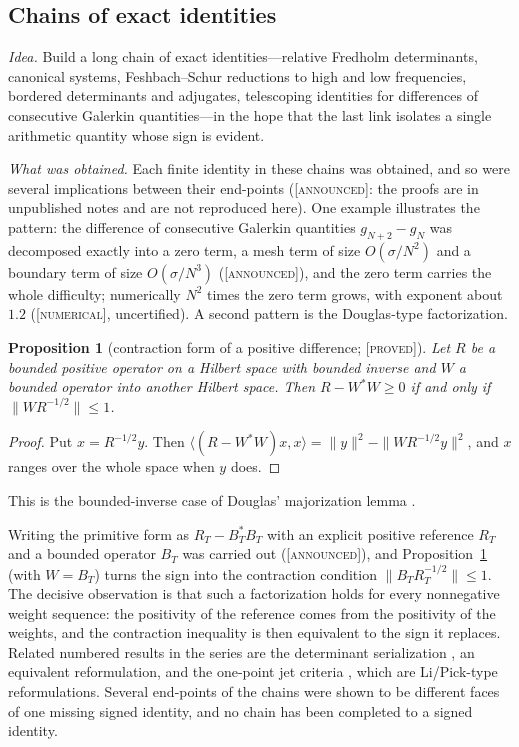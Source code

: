 \documentclass[11pt]{amsart}
\newtheorem{proposition}[theorem]{Proposition}
\theoremstyle{definition}
\theoremstyle{remark}
\numberwithin{equation}{section}
\newcommand{\stag}[1]{\textsc{[#1]}}
\newcommand{\PROVED}{\stag{proved}}
\newcommand{\NUM}{\stag{numerical}}
\newcommand{\ANNOUNCED}{\stag{announced}}
\newcommand{\entry}[1]{\par\smallskip\noindent\textit{#1.}\enspace}
\begin{document}
\subsection{Chains of exact identities}\label{w6:fam:R12}

\entry{Idea} Build a long chain of exact identities---relative Fredholm determinants, canonical
systems, Feshbach--Schur reductions to high and low frequencies, bordered determinants and
adjugates, telescoping identities for differences of consecutive Galerkin quantities---in the hope
that the last link isolates a single arithmetic quantity whose sign is evident.

\entry{What was obtained} Each finite identity in these chains was obtained, and so were several
implications between their end-points (\ANNOUNCED: the proofs are in unpublished notes and are not
reproduced here). One example illustrates the pattern: the difference of consecutive Galerkin
quantities $g_{N+2}-g_N$ was decomposed exactly into a zero term, a mesh term of size
$O(\sigma/N^2)$ and a boundary term of size $O(\sigma/N^3)$ (\ANNOUNCED), and the zero term carries
the whole difficulty; numerically $N^2$ times the zero term grows, with exponent about $1.2$ (\NUM,
uncertified). A second pattern is the Douglas-type factorization.

\begin{proposition}[contraction form of a positive difference; \PROVED]\label{w6:prop:douglas}
Let $R$ be a bounded positive operator on a Hilbert space with bounded inverse and $W$ a bounded
operator into another Hilbert space. Then $R-W^*W\ge0$ if and only if $\|WR^{-1/2}\|\le1$.
\end{proposition}
\begin{proof}
Put $x=R^{-1/2}y$. Then $\langle(R-W^*W)x,x\rangle=\|y\|^2-\|WR^{-1/2}y\|^2$, and $x$ ranges over
the whole space when $y$ does.
\end{proof}
This is the bounded-inverse case of Douglas' majorization lemma \cite{Douglas1966}.

Writing the primitive form as $R_T-B_T^*B_T$ with an explicit positive reference $R_T$ and a bounded
operator $B_T$ was carried out (\ANNOUNCED), and Proposition~\ref{w6:prop:douglas} (with $W=B_T$) turns
the sign into the contraction condition $\|B_TR_T^{-1/2}\|\le1$.
The decisive observation is that such a factorization holds for every nonnegative weight sequence:
the positivity of the reference comes from the positivity of the weights, and the contraction
inequality is then equivalent to the sign it replaces. Related numbered results in the series are
the determinant serialization \cite[Theorem~9.39]{P36}, an equivalent reformulation, and the
one-point jet criteria \cite[Theorems~9.53 and 9.100]{P36}, which are Li/Pick-type reformulations.
Several end-points of the chains were shown to be different faces of one missing signed identity,
and no chain has been completed to a signed identity.
\end{document}

